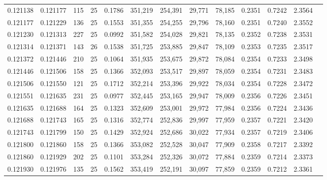 \begin{tabular}{rrrrrrrrrrrrr}
0.121138 & 0.121177 &   115 &  25 &                                     0.1786 & 351,219 & 254,391 &  29,771 &  78,185 & 0.2351 & 0.7242 & 2.3564 \\
0.121177 & 0.121229 &   136 &  25 &                                     0.1553 & 351,355 & 254,255 &  29,796 &  78,160 & 0.2351 & 0.7240 & 2.3552 \\
0.121230 & 0.121313 &   227 &  25 &                                     0.0992 & 351,582 & 254,028 &  29,821 &  78,135 & 0.2352 & 0.7238 & 2.3531 \\
0.121314 & 0.121371 &   143 &  26 &                                     0.1538 & 351,725 & 253,885 &  29,847 &  78,109 & 0.2353 & 0.7235 & 2.3517 \\
0.121372 & 0.121446 &   210 &  25 &                                     0.1064 & 351,935 & 253,675 &  29,872 &  78,084 & 0.2354 & 0.7233 & 2.3498 \\
0.121446 & 0.121506 &   158 &  25 &                                     0.1366 & 352,093 & 253,517 &  29,897 &  78,059 & 0.2354 & 0.7231 & 2.3483 \\
0.121506 & 0.121550 &   121 &  25 &                                     0.1712 & 352,214 & 253,396 &  29,922 &  78,034 & 0.2354 & 0.7228 & 2.3472 \\
0.121551 & 0.121635 &   231 &  25 &                                     0.0977 & 352,445 & 253,165 &  29,947 &  78,009 & 0.2356 & 0.7226 & 2.3451 \\
0.121635 & 0.121688 &   164 &  25 &                                     0.1323 & 352,609 & 253,001 &  29,972 &  77,984 & 0.2356 & 0.7224 & 2.3436 \\
0.121688 & 0.121743 &   165 &  25 &                                     0.1316 & 352,774 & 252,836 &  29,997 &  77,959 & 0.2357 & 0.7221 & 2.3420 \\
0.121743 & 0.121799 &   150 &  25 &                                     0.1429 & 352,924 & 252,686 &  30,022 &  77,934 & 0.2357 & 0.7219 & 2.3406 \\
0.121800 & 0.121860 &   158 &  25 &                                     0.1366 & 353,082 & 252,528 &  30,047 &  77,909 & 0.2358 & 0.7217 & 2.3392 \\
0.121860 & 0.121929 &   202 &  25 &                                     0.1101 & 353,284 & 252,326 &  30,072 &  77,884 & 0.2359 & 0.7214 & 2.3373 \\
0.121930 & 0.121976 &   135 &  25 &                                     0.1562 & 353,419 & 252,191 &  30,097 &  77,859 & 0.2359 & 0.7212 & 2.3361 \\

\end{tabular}
